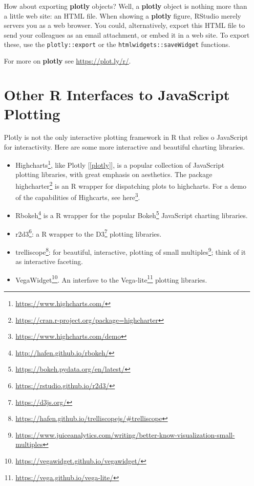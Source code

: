 \documentclass[]{book}
\renewcommand{\href}[2]{#2\footnote{\url{#1}}}
\theoremstyle{definition}
\theoremstyle{definition}
\theoremstyle{definition}
\theoremstyle{remark}
\begin{document}
\hypertarget{htmlwidget-121c9fab5d2e067d98f4}{}

How about exporting \textbf{plotly} objects?
Well, a \textbf{plotly} object is nothing more than a little web site: an HTML file.
When showing a \textbf{plotly} figure, RStudio merely servers you as a web browser.
You could, alternatively, export this HTML file to send your colleagues as an email attachment, or embed it in a web site.
To export these, use the \texttt{plotly::export} or the \texttt{htmlwidgets::saveWidget} functions.

For more on \textbf{plotly} see \url{https://plot.ly/r/}.

\hypertarget{other-r-interfaces-to-javascript-plotting}{%
\section{Other R Interfaces to JavaScript Plotting}\label{other-r-interfaces-to-javascript-plotting}}

Plotly is not the only interactive plotting framework in R that relies o JavaScript for interactivity.
Here are some more interactive and beautiful charting libraries.

\begin{itemize}
\item
  \href{https://www.highcharts.com/}{Highcharts}, like Plotly {[}\ref{plotly}{]}, is a popular collection of JavaScript plotting libraries, with great emphasis on aesthetics.
  The package \href{https://cran.r-project.org/package=highcharter}{highcharter} is an R wrapper for dispatching plots to highcharts.
  For a demo of the capabilities of Highcarts, see \href{https://www.highcharts.com/demo}{here}.
\item
  \href{http://hafen.github.io/rbokeh/}{Rbokeh} is a R wrapper for the popular \href{https://bokeh.pydata.org/en/latest/}{Bokeh} JavaScript charting libraries.
\item
  \href{https://rstudio.github.io/r2d3/}{r2d3}: a R wrapper to the \href{https://d3js.org/}{D3} plotting libraries.
\item
  \href{https://hafen.github.io/trelliscopejs/\#trelliscope}{trelliscope}: for beautiful, interactive, plotting of \href{https://www.juiceanalytics.com/writing/better-know-visualization-small-multiples}{small multiples}; think of it as interactive faceting.
\item
  \href{https://vegawidget.github.io/vegawidget/}{VegaWidget}. An interfave to the \href{https://vega.github.io/vega-lite/}{Vega-lite} plotting libraries.
\end{itemize}
\end{document}
